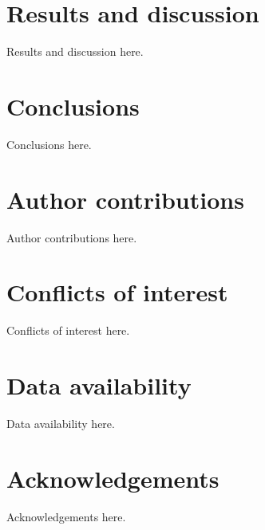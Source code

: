 \documentclass[10pt,a4paper,twoside,twocolumn]{article}
\begin{document}
\section{Results and discussion}
\label{sec:results}
Results and discussion here.

\section{Conclusions}
\label{sec:conclusions}
Conclusions here.

\section*{Author contributions}
Author contributions here.

\section*{Conflicts of interest}
Conflicts of interest here.

\section*{Data availability}
Data availability here.

\section*{Acknowledgements}
Acknowledgements here.



\end{document}
